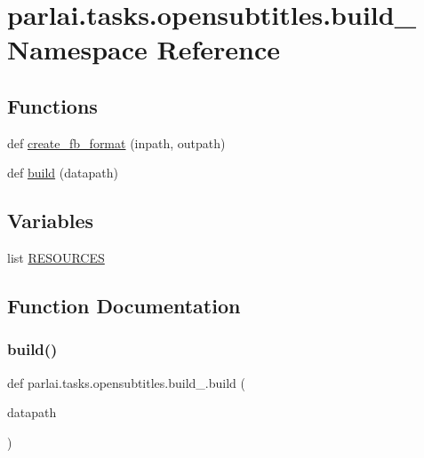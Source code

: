 \hypertarget{namespaceparlai_1_1tasks_1_1opensubtitles_1_1build__2009}{}\section{parlai.\+tasks.\+opensubtitles.\+build\+\_ Namespace Reference}
\label{namespaceparlai_1_1tasks_1_1opensubtitles_1_1build__2009}
\subsection*{Functions}
\begin{DoxyCompactItemize}
\item 
def \hyperlink{namespaceparlai_1_1tasks_1_1opensubtitles_1_1build__2009_ad149abe80311061e9b055102702633ed}{create\+\_\+fb\+\_\+format} (inpath, outpath)
\item 
def \hyperlink{namespaceparlai_1_1tasks_1_1opensubtitles_1_1build__2009_a1b4aedcfe5cf20f4708277aba234e048}{build} (datapath)
\end{DoxyCompactItemize}
\subsection*{Variables}
\begin{DoxyCompactItemize}
\item 
list \hyperlink{namespaceparlai_1_1tasks_1_1opensubtitles_1_1build__2009_a337f1fffc35600698976620cf8fb7248}{R\+E\+S\+O\+U\+R\+C\+ES}
\end{DoxyCompactItemize}


\subsection{Function Documentation}
\mbox{\label{namespaceparlai_1_1tasks_1_1opensubtitles_1_1build__2009_a1b4aedcfe5cf20f4708277aba234e048}} 
\subsubsection{\texorpdfstring{build()}{build()}}
{\footnotesize\ttfamily def parlai.\+tasks.\+opensubtitles.\+build\+\_.\+build (\begin{DoxyParamCaption}\item[{}]{datapath }\end{DoxyParamCaption})}

